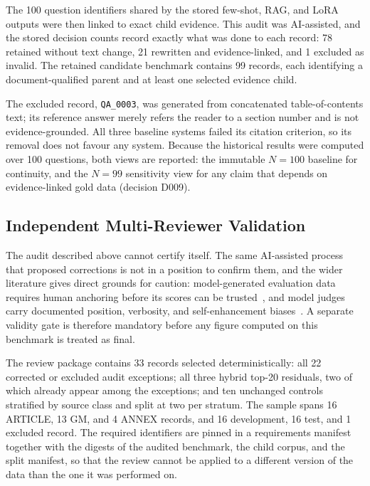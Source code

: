 The 100 question identifiers shared by the stored few-shot, \ac{RAG}, and \ac{LoRA} outputs were then linked to exact child evidence. This audit was \ac{AI}-assisted, and the stored decision counts record exactly what was done to each record: 78 retained without text change, 21 rewritten and evidence-linked, and 1 excluded as invalid. The retained candidate benchmark contains 99 records, each identifying a document-qualified parent and at least one selected evidence child.

The excluded record, \texttt{QA\_0003}, was generated from concatenated table-of-contents text; its reference answer merely refers the reader to a section number and is not evidence-grounded. All three baseline systems failed its citation criterion, so its removal does not favour any system. Because the historical results were computed over 100 questions, both views are reported: the immutable $N=100$ baseline for continuity, and the $N=99$ sensitivity view for any claim that depends on evidence-linked gold data (decision D009).

\subsection{Independent Multi-Reviewer Validation}
\label{sec:method-review}

The audit described above cannot certify itself. The same \ac{AI}-assisted process that proposed corrections is not in a position to confirm them, and the wider literature gives direct grounds for caution: model-generated evaluation data requires human anchoring before its scores can be trusted~\cite{saadfalcon2024ares}, and model judges carry documented position, verbosity, and self-enhancement biases~\cite{zheng2023judging}. A separate validity gate is therefore mandatory before any figure computed on this benchmark is treated as final.

The review package contains 33 records selected deterministically: all 22 corrected or excluded audit exceptions; all three hybrid top-20 residuals, two of which already appear among the exceptions; and ten unchanged controls stratified by source class and split at two per stratum. The sample spans 16 ARTICLE, 13 GM, and 4 ANNEX records, and 16 development, 16 test, and 1 excluded record. The required identifiers are pinned in a requirements manifest together with the digests of the audited benchmark, the child corpus, and the split manifest, so that the review cannot be applied to a different version of the data than the one it was performed on.

